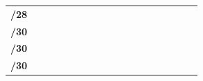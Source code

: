 \documentclass[11pt,a4paper]{report}
\begin{document}
\begin{center}
\begin{longtable}{rlcccccccccccccccc}
                \textbf{/28}                                                                                             &                       &                           &                           &                           &                           &                           &                            &                            &                            & \cellcolor[HTML]{BFBFBF}        & \cellcolor[HTML]{BFBFBF}        &                                 &                                 &                                 &                                 &                                  &                                 \\
                \textbf{/30}                                                                                             &                       &                           &                           &                           &                           &                           &                            & \cellcolor[HTML]{C09FE5}   & \cellcolor[HTML]{C09FE5}   &                                 &                                 &                                 &                                 &                                 &                                 &                                  &                                 \\
                \textbf{/30}                                                                                             &                       &                           &                           &                           &                           & \cellcolor[HTML]{C09FE5}  & \cellcolor[HTML]{C09FE5}   &                            &                            &                                 &                                 &                                 &                                 &                                 &                                 &                                  &                                 \\
                \textbf{/30}                                                                                             &                       &                           &                           & \cellcolor[HTML]{C09FE5}  & \cellcolor[HTML]{C09FE5}  &                           &                            &                            &                            &                                 &                                 &                                 &                                 &                                 &                                 &                                  &                                 \\

\end{longtable}
\end{center}
\end{document}
